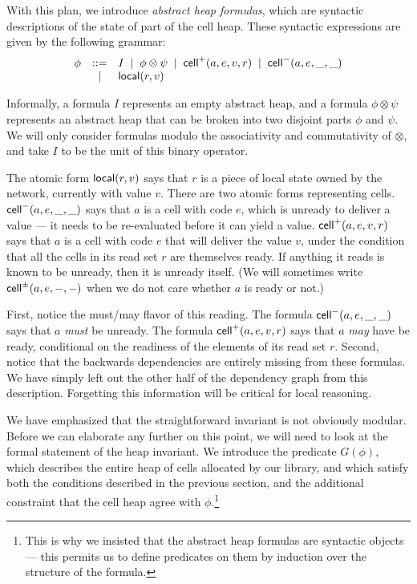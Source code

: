 With this plan, we introduce \emph{abstract heap formulas}, which are
syntactic descriptions of the state of part of the cell heap. These
syntactic expressions are given by the following grammar:
\begin{displaymath}
  \begin{array}{lcl}
    \phi & ::= & I \;\;|\;\; \phi \otimes \psi \;\;|\;\; \mathsf{cell}^{+}({a}, {e}, {v}, {r}) \;\;|\;\; \mathsf{cell}^{-}({a}, {e}, {\_}, {\_})\\
         &  |  & \mathsf{local}({r}, {v}) 
  \end{array}
\end{displaymath}

Informally, a formula $I$ represents an empty abstract heap, and a
formula $\phi \otimes \psi$ represents an abstract heap that can be
broken into two disjoint parts $\phi$ and $\psi$. We will only
consider formulas modulo the associativity and commutativity of
$\otimes$, and take $I$ to be the unit of this binary operator.

The atomic form $\mathsf{local}({r}, {v})$ says that $r$ is a piece of local
state owned by the network, currently with value $v$. There are two
atomic forms representing cells. $\mathsf{cell}^{-}({a}, {e}, {\_}, {\_})$ says that $a$ is a
cell with code $e$, which is unready to deliver a value --- it needs
to be re-evaluated before it can yield a value. $\mathsf{cell}^{+}({a}, {e}, {v}, {r})$
says that $a$ is a cell with code $e$ that will deliver the value $v$,
under the condition that all the cells in its read set $r$ are
themselves ready. If anything it reads is known to be unready, then it
is unready itself. (We will sometimes write $\mathsf{cell}^{\pm}({a}, {e}, {-}, {-})$ when
we do not care whether $a$ is ready or not.)

First, notice the must/may flavor of this reading. The formula
$\mathsf{cell}^{-}({a}, {e}, {\_}, {\_})$ says that $a$ \emph{must} be unready.  The formula
$\mathsf{cell}^{+}({a}, {e}, {v}, {r})$ says that $a$ \emph{may} have be ready,
conditional on the readiness of the elements of its read set
$r$. Second, notice that the backwards dependencies are entirely
missing from these formulas. We have simply left out the other half of
the dependency graph from this description. Forgetting this
information will be critical for local reasoning.

We have emphasized that the straightforward invariant is not obviously
modular. Before we can elaborate any further on this point, we will
need to look at the formal statement of the heap invariant. We
introduce the predicate $G(\phi)$, which describes the entire heap of
cells allocated by our library, and which satisfy both the conditions
described in the previous section, and the additional constraint that
the cell heap agree with $\phi$.\footnote{This is why we insisted that
  the abstract heap formulas are syntactic objects --- this permits us
  to define predicates on them by induction over the structure of the
formula.}


